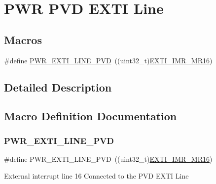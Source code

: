 \hypertarget{group___p_w_r___p_v_d___e_x_t_i___line}{}\section{P\+WR P\+VD E\+X\+TI Line}
\label{group___p_w_r___p_v_d___e_x_t_i___line}
\subsection*{Macros}
\begin{DoxyCompactItemize}
\item 
\#define \mbox{\hyperlink{group___p_w_r___p_v_d___e_x_t_i___line_ga43a49255649e03d2d2b6b12c5c379d2b}{P\+W\+R\+\_\+\+E\+X\+T\+I\+\_\+\+L\+I\+N\+E\+\_\+\+P\+VD}}~((uint32\+\_\+t)\mbox{\hyperlink{group___peripheral___registers___bits___definition_ga7419f78ed9044bdd237b452ef49e1b7f}{E\+X\+T\+I\+\_\+\+I\+M\+R\+\_\+\+M\+R16}})
\end{DoxyCompactItemize}


\subsection{Detailed Description}


\subsection{Macro Definition Documentation}
\mbox{\label{group___p_w_r___p_v_d___e_x_t_i___line_ga43a49255649e03d2d2b6b12c5c379d2b}} 
\subsubsection{\texorpdfstring{P\+W\+R\+\_\+\+E\+X\+T\+I\+\_\+\+L\+I\+N\+E\+\_\+\+P\+VD}{PWR\_EXTI\_LINE\_PVD}}
{\footnotesize\ttfamily \#define P\+W\+R\+\_\+\+E\+X\+T\+I\+\_\+\+L\+I\+N\+E\+\_\+\+P\+VD~((uint32\+\_\+t)\mbox{\hyperlink{group___peripheral___registers___bits___definition_ga7419f78ed9044bdd237b452ef49e1b7f}{E\+X\+T\+I\+\_\+\+I\+M\+R\+\_\+\+M\+R16}})}

External interrupt line 16 Connected to the P\+VD E\+X\+TI Line 